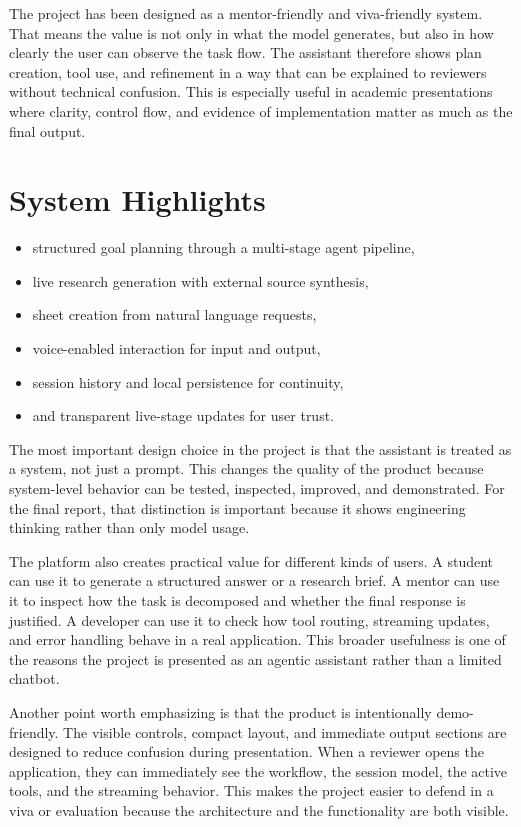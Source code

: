 \documentclass[11pt,oneside]{report}
\begin{document}
The project has been designed as a mentor-friendly and viva-friendly system. That means the value is not only in what the model generates, but also in how clearly the user can observe the task flow. The assistant therefore shows plan creation, tool use, and refinement in a way that can be explained to reviewers without technical confusion. This is especially useful in academic presentations where clarity, control flow, and evidence of implementation matter as much as the final output.

\section{System Highlights}
\begin{itemize}[leftmargin=1.2cm]
  \item structured goal planning through a multi-stage agent pipeline,
  \item live research generation with external source synthesis,
  \item sheet creation from natural language requests,
  \item voice-enabled interaction for input and output,
  \item session history and local persistence for continuity,
  \item and transparent live-stage updates for user trust.
\end{itemize}

The most important design choice in the project is that the assistant is treated as a system, not just a prompt. This changes the quality of the product because system-level behavior can be tested, inspected, improved, and demonstrated. For the final report, that distinction is important because it shows engineering thinking rather than only model usage.

The platform also creates practical value for different kinds of users. A student can use it to generate a structured answer or a research brief. A mentor can use it to inspect how the task is decomposed and whether the final response is justified. A developer can use it to check how tool routing, streaming updates, and error handling behave in a real application. This broader usefulness is one of the reasons the project is presented as an agentic assistant rather than a limited chatbot.

Another point worth emphasizing is that the product is intentionally demo-friendly. The visible controls, compact layout, and immediate output sections are designed to reduce confusion during presentation. When a reviewer opens the application, they can immediately see the workflow, the session model, the active tools, and the streaming behavior. This makes the project easier to defend in a viva or evaluation because the architecture and the functionality are both visible.
\end{document}
